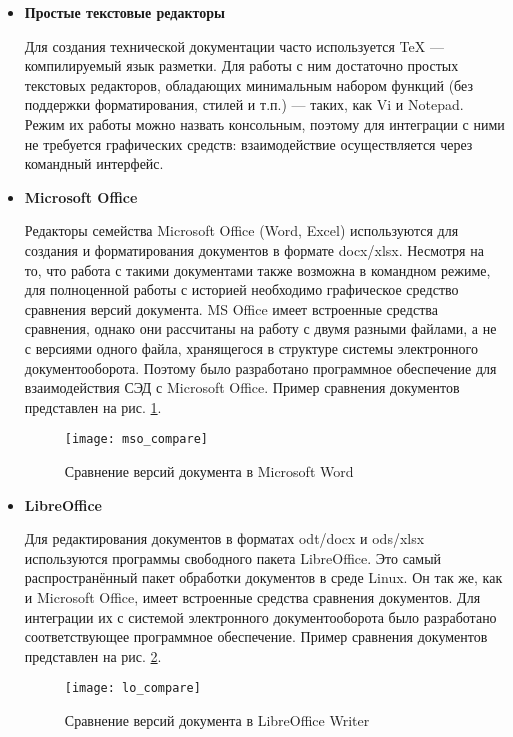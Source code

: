 \begin{itemize}[label=\textbf{---} ]
	
	\item \textbf{Простые текстовые редакторы}

	Для создания технической документации часто используется TeX --- компилируемый язык разметки. Для работы с ним достаточно простых текстовых редакторов, обладающих минимальным набором функций (без поддержки форматирования, стилей и т.п.) --- таких, как Vi и Notepad. Режим их работы можно назвать консольным, поэтому для интеграции с ними не требуется графических средств: взаимодействие осуществляется через командный интерфейс.
	
	\item \textbf{Microsoft Office}

	Редакторы семейства Microsoft Office (Word, Excel) используются для создания и форматирования документов в формате docx/xlsx. Несмотря на то, что работа с такими документами также возможна в командном режиме, для полноценной работы с историей необходимо графическое средство сравнения версий документа. MS Office имеет встроенные средства сравнения, однако они рассчитаны на работу с двумя разными файлами, а не с версиями одного файла, хранящегося в структуре системы электронного документооборота. Поэтому было разработано программное обеспечение для взаимодействия СЭД с Microsoft Office. Пример сравнения документов представлен на рис. \ref{img:mso_compare}.
	\begin{figure}[h!]
		\centering
		\texttt{[image: mso\_compare]}
		\caption{Сравнение версий документа в Microsoft Word}
		\label{img:mso_compare}
	\end{figure}

	\item \textbf{LibreOffice}

	Для редактирования документов в форматах odt/docx и ods/xlsx используются программы свободного пакета LibreOffice. Это самый распространённый пакет обработки документов в среде Linux. Он так же, как и Microsoft Office, имеет встроенные средства сравнения документов. Для интеграции их с системой электронного документооборота было разработано соответствующее программное обеспечение. Пример сравнения документов представлен на рис. \ref{img:lo_compare}.
	\begin{figure}[h!]
		\centering
		\texttt{[image: lo\_compare]}
		\caption{Сравнение версий документа в LibreOffice Writer}
		\label{img:lo_compare}
	\end{figure}
\end{itemize}
\FloatBarrier

